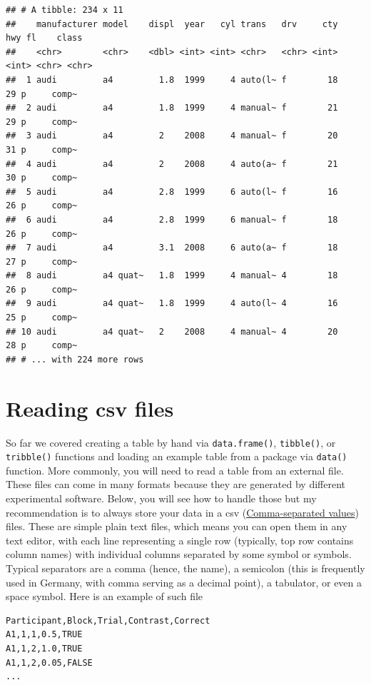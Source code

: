 \documentclass[
]{book}
\begin{document}
\begin{verbatim}
## # A tibble: 234 x 11
##    manufacturer model    displ  year   cyl trans   drv     cty   hwy fl    class
##    <chr>        <chr>    <dbl> <int> <int> <chr>   <chr> <int> <int> <chr> <chr>
##  1 audi         a4         1.8  1999     4 auto(l~ f        18    29 p     comp~
##  2 audi         a4         1.8  1999     4 manual~ f        21    29 p     comp~
##  3 audi         a4         2    2008     4 manual~ f        20    31 p     comp~
##  4 audi         a4         2    2008     4 auto(a~ f        21    30 p     comp~
##  5 audi         a4         2.8  1999     6 auto(l~ f        16    26 p     comp~
##  6 audi         a4         2.8  1999     6 manual~ f        18    26 p     comp~
##  7 audi         a4         3.1  2008     6 auto(a~ f        18    27 p     comp~
##  8 audi         a4 quat~   1.8  1999     4 manual~ 4        18    26 p     comp~
##  9 audi         a4 quat~   1.8  1999     4 auto(l~ 4        16    25 p     comp~
## 10 audi         a4 quat~   2    2008     4 manual~ 4        20    28 p     comp~
## # ... with 224 more rows
\end{verbatim}

\hypertarget{readr}{%
\section{Reading csv files}\label{readr}}

So far we covered creating a table by hand via \texttt{data.frame()}, \texttt{tibble()}, or \texttt{tribble()} functions and loading an example table from a package via \texttt{data()} function. More commonly, you will need to read a table from an external file. These files can come in many formats because they are generated by different experimental software. Below, you will see how to handle those but my recommendation is to always store your data in a csv (\href{https://en.wikipedia.org/wiki/Comma-separated_values}{Comma-separated values}) files. These are simple plain text files, which means you can open them in any text editor, with each line representing a single row (typically, top row contains column names) with individual columns separated by some symbol or symbols. Typical separators are a comma (hence, the name), a semicolon (this is frequently used in Germany, with comma serving as a decimal point), a tabulator, or even a space symbol. Here is an example of such file

\begin{verbatim}
Participant,Block,Trial,Contrast,Correct
A1,1,1,0.5,TRUE
A1,1,2,1.0,TRUE
A1,1,2,0.05,FALSE
...
\end{verbatim}
\end{document}
